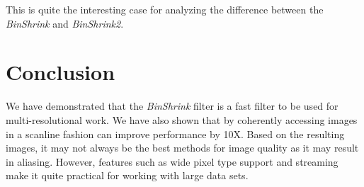 \documentclass{InsightArticle}
\begin{document}
This is quite the interesting case for analyzing the difference
between the \textit{BinShrink} and \textit{BinShrink2}.

\section{Conclusion}

We have demonstrated that the \textit{BinShrink} filter is a fast
filter to be used for multi-resolutional work. We have also shown that
by coherently accessing images in a scanline fashion can improve
performance by 10X. Based on the resulting
images, it may not always be the best methods for image quality as it
may result in aliasing. However, features such as wide pixel type
support and streaming make it quite practical for working with large
data sets.




\end{document}
